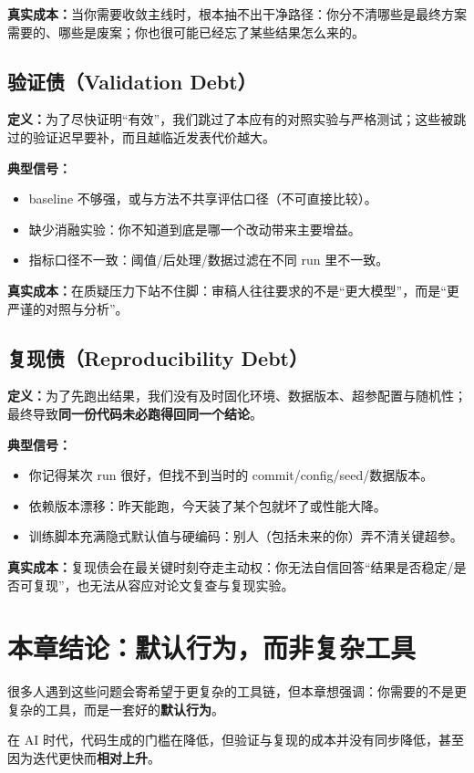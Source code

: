 \textbf{真实成本：}当你需要收敛主线时，根本抽不出干净路径：你分不清哪些是最终方案需要的、哪些是废案；你也很可能已经忘了某些结果怎么来的。

\subsection{验证债（Validation Debt）}
\textbf{定义：}为了尽快证明“有效”，我们跳过了本应有的对照实验与严格测试；这些被跳过的验证迟早要补，而且越临近发表代价越大。

\textbf{典型信号：}
\begin{itemize}
  \item baseline 不够强，或与方法不共享评估口径（不可直接比较）。
  \item 缺少消融实验：你不知道到底是哪一个改动带来主要增益。
  \item 指标口径不一致：阈值/后处理/数据过滤在不同 run 里不一致。
\end{itemize}

\textbf{真实成本：}在质疑压力下站不住脚：审稿人往往要求的不是“更大模型”，而是“更严谨的对照与分析”。

\subsection{复现债（Reproducibility Debt）}
\textbf{定义：}为了先跑出结果，我们没有及时固化环境、数据版本、超参配置与随机性；最终导致\textbf{同一份代码未必跑得回同一个结论}。

\textbf{典型信号：}
\begin{itemize}
  \item 你记得某次 run 很好，但找不到当时的 commit/config/seed/数据版本。
  \item 依赖版本漂移：昨天能跑，今天装了某个包就坏了或性能大降。
  \item 训练脚本充满隐式默认值与硬编码：别人（包括未来的你）弄不清关键超参。
\end{itemize}

\textbf{真实成本：}复现债会在最关键时刻夺走主动权：你无法自信回答“结果是否稳定/是否可复现”，也无法从容应对论文复查与复现实验。

\section{本章结论：默认行为，而非复杂工具}
很多人遇到这些问题会寄希望于更复杂的工具链，但本章想强调：你需要的不是更复杂的工具，而是一套好的\textbf{默认行为}。

在 AI 时代，代码生成的门槛在降低，但验证与复现的成本并没有同步降低，甚至因为迭代更快而\textbf{相对上升}。

